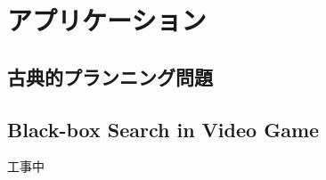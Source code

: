 \documentclass{book}
\begin{document}
\chapter{アプリケーション}
\section{古典的プランニング問題}

\section{Black-box Search in Video Game}
工事中

\begin{comment}
\section{Multiple Sequence Alignment}
工事中

\section{Model Checking}
工事中

\end{comment}


\begin{comment}
\chapter{関連分野}
\subsection{ゲーム木探索}
工事中

\section{制約充足問題}
工事中

\end{comment}





\end{document}
